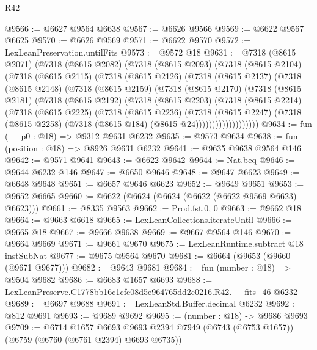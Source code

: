 \begin{lexlean}{R42}
\begin{coremodule}
{@9566 := @6627 @9564 @6638
@9567 := @6626 @9566
@9569 := @6622 @9567 @6625
@9570 := @6626 @9569
@9571 := @6622 @9570
@9572 := LexLeanPreservation.untilFits
@9573 := @9572 @18
@9631 := @7318
    (@8615 @2071)
    (@7318
      (@8615 @2082)
      (@7318
        (@8615 @2093)
        (@7318
          (@8615 @2104)
          (@7318
            (@8615 @2115)
            (@7318
              (@8615 @2126)
              (@7318
                (@8615 @2137)
                (@7318
                  (@8615 @2148)
                  (@7318
                    (@8615 @2159)
                    (@7318
                      (@8615 @2170)
                      (@7318
                        (@8615 @2181)
                        (@7318
                          (@8615 @2192)
                          (@7318
                            (@8615 @2203)
                            (@7318
                              (@8615 @2214)
                              (@7318
                                (@8615 @2225)
                                (@7318
                                  (@8615 @2236)
                                  (@7318
                                    (@8615 @2247)
                                    (@7318
                                      (@8615 @2258)
                                      (@7318 (@8615 @184) (@8615 @24)))))))))))))))))))
@9634 := fun (__p0 : @18) => @9312 @9631 @6232
@9635 := @9573 @9634
@9638 := fun (position : @18) => @8926 @9631 @6232
@9641 := @9635 @9638 @9564 @146
@9642 := @9571 @9641
@9643 := @6622 @9642
@9644 := Nat.beq
@9646 := @9644 @6232 @146
@9647 := @6650 @9646
@9648 := @9647 @6623
@9649 := @6648 @9648
@9651 := @6657 @9646 @6623
@9652 := @9649 @9651
@9653 := @9652 @6665
@9660 := @6622 (@6624 (@6624 (@6622 (@6622 @9569 @6623) @6623)))
@9661 := @8335 @9563
@9662 := Prod.fst.{0, 0}
@9663 := @9662 @18
@9664 := @9663 @6618
@9665 := LexLeanCollections.iterateUntil
@9666 := @9665 @18
@9667 := @9666 @9638
@9669 := @9667 @9564 @146
@9670 := @9664 @9669
@9671 := @9661 @9670
@9675 := LexLeanRuntime.subtract @18 instSubNat
@9677 := @9675 @9564 @9670
@9681 := @6664 (@9653 (@9660 (@9671 @9677)))
@9682 := @9643 @9681
@9684 := fun (number : @18) => @9504 @9682
@9686 := @6683 @1657 @6693
@9688 := LexLeanPreserve.C1778bb16c1cfe08d5e964765dd2c0216.R42.__fits_46 @6232
@9689 := @6697 @9688
@9691 := LexLeanStd.Buffer.decimal @6232
@9692 := @812 @9691
@9693 := @9689 @9692
@9695 := (number : @18) -> @9686 @9693
@9709 := @6714
    @1657
    @6693
    @9693
    @2394
    @7949
    (@6743 (@6753 @1657))
    (@6759 (@6760 (@6761 @2394) @6693 @6735))
}
\end{coremodule}
\end{lexlean}
